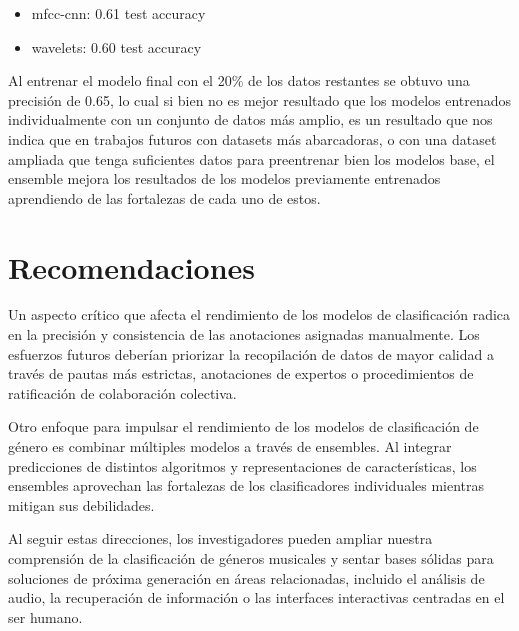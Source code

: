 \documentclass[colorinlistoftodos,twoside,twocolumn,10pt]{article} %
\begin{document}
\begin{itemize}
\item mfcc-cnn: 0.61 test accuracy
\item wavelets: 0.60 test accuracy 
\end{itemize}

Al entrenar el modelo final con el 20\% de los datos restantes se obtuvo una precisi\'on de 0.65, lo cual si bien no es mejor resultado que los modelos entrenados individualmente con un conjunto de datos m\'as amplio, es un resultado que nos indica que en trabajos futuros con datasets m\'as abarcadoras, o con una dataset ampliada que tenga suficientes datos para preentrenar bien los modelos base, el ensemble mejora los resultados de los modelos previamente entrenados aprendiendo de las fortalezas de cada uno de estos.


	\section{Recomendaciones}
  
Un aspecto cr\'itico que afecta el rendimiento de los modelos de clasificaci\'on radica en la precisi\'on y consistencia de las anotaciones asignadas manualmente. Los esfuerzos futuros deber\'ian priorizar la recopilaci\'on de datos de mayor calidad a trav\'es de pautas m\'as estrictas, anotaciones de expertos o procedimientos de ratificaci\'on de colaboraci\'on colectiva.

Otro enfoque para impulsar el rendimiento de los modelos de clasificaci\'on de g\'enero es combinar m\'ultiples modelos a trav\'es de ensembles. Al integrar predicciones de distintos algoritmos y representaciones de caracter\'isticas, los ensembles aprovechan las fortalezas de los clasificadores individuales mientras mitigan sus debilidades.  

  Al seguir estas direcciones, los investigadores pueden ampliar nuestra comprensi\'on de la clasificaci\'on de g\'eneros musicales y sentar bases s\'olidas para soluciones de pr\'oxima generaci\'on en \'areas relacionadas, incluido el an\'alisis de audio, la recuperaci\'on de informaci\'on o las interfaces interactivas centradas en el ser humano.
  
\end{document}
